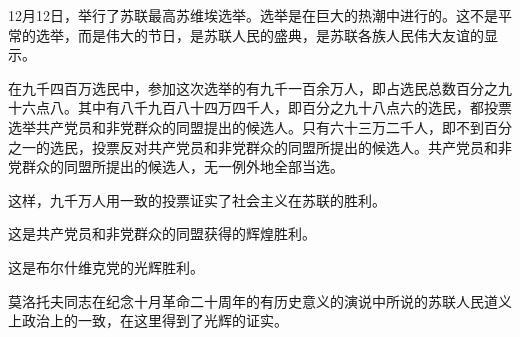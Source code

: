 12月12日，举行了苏联最高苏维埃选举。选举是在巨大的热潮中进行的。这不是平常的选举，而是伟大的节日，是苏联人民的盛典，是苏联各族人民伟大友谊的显示。

在九千四百万选民中，参加这次选举的有九千一百余万人，即占选民总数百分之九十六点八。其中有八千九百八十四万四千人，即百分之九十八点六的选民，都投票选举共产党员和非党群众的同盟提出的候选人。只有六十三万二千人，即不到百分之一的选民，投票反对共产党员和非党群众的同盟所提出的候选人。共产党员和非党群众的同盟所提出的候选人，无一例外地全部当选。

这样，九千万人用一致的投票证实了社会主义在苏联的胜利。

这是共产党员和非党群众的同盟获得的辉煌胜利。

这是布尔什维克党的光辉胜利。

莫洛托夫同志在纪念十月革命二十周年的有历史意义的演说中所说的苏联人民道义上政治上的一致，在这里得到了光辉的证实。



